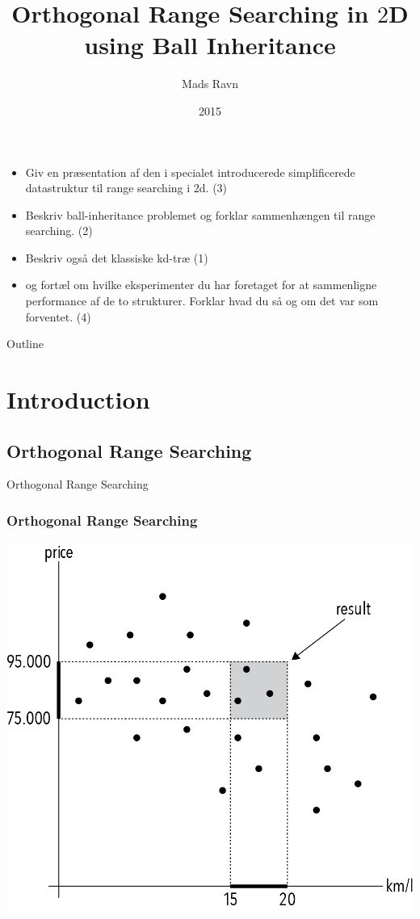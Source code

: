 \documentclass[pdf]{beamer}
\title{Orthogonal Range Searching in $2$D\\ using Ball Inheritance}
\author{Mads Ravn}
\institute{Computer Science, Aarhus University}
\date{2015}
\begin{document}
\begin{frame}
  \titlepage
\end{frame}

\begin{frame}
  \begin{itemize}
    \item Giv en præsentation af den i specialet introducerede simplificerede datastruktur til range searching i 2d. (3)
    \item Beskriv ball-inheritance problemet og forklar sammenhængen til range searching. (2)
    \item Beskriv også det klassiske kd-træ (1)
    \item og fortæl om hvilke eksperimenter du har foretaget for at sammenligne performance af de to strukturer. Forklar hvad du så og om det var som forventet. (4)
  \end{itemize}
\end{frame}

\begin{frame}{Outline}
  \tableofcontents
\end{frame}

\section{Introduction}
\subsection{Orthogonal Range Searching}

\begin{frame}{Orthogonal Range Searching}
  \frametitle{Orthogonal Range Searching}
    \begin{center}
      \includegraphics[scale=0.8]{pictures/introduction.png}
    \end{center}

\end{frame}
\end{document}
